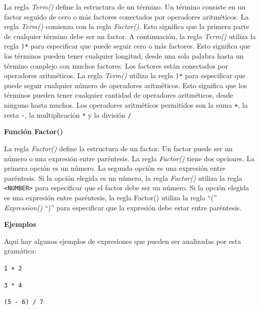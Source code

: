 \noindent La regla \textit{Term()} define la estructura de un término. Un término consiste en un factor seguido de cero o más factores conectados por operadores aritméticos. La regla \textit{Term()} comienza con la regla \textit{Factor()}. Esto significa que la primera parte de cualquier término debe ser un factor. A continuación, la regla \textit{Term()} utiliza la regla \lstinline|)*| para especificar que puede seguir cero o más factores. Esto significa que los términos pueden tener cualquier longitud, desde una sola palabra hasta un término complejo con muchos factores.
Los factores están conectados por operadores aritméticos. La regla \textit{Term()} utiliza la regla \lstinline|)*| para especificar que puede seguir cualquier número de operadores aritméticos. Esto significa que los términos pueden tener cualquier cantidad de operadores aritméticos, desde ninguno hasta muchos.
Los operadores aritméticos permitidos son la suma \lstinline|+|, la resta \lstinline|-|, la multiplicación \lstinline|*| y la división \lstinline|/|

\phantom{text}

\noindent \textbf{Función Factor()}

\phantom{text}

\lstset{inputencoding=utf8/latin1}

\noindent La regla \textit{Factor()} define la estructura de un factor. Un factor puede ser un número o una expresión entre paréntesis. La regla \textit{Factor()} tiene dos opciones. La primera opción es un número. La segunda opción es una expresión entre paréntesis. Si la opción elegida es un número, la regla \textit{Factor()} utiliza la regla \lstinline[keywordstyle=\color{black}]|<NUMBER>| para especificar que el factor debe ser un número. Si la opción elegida es una expresión entre paréntesis, la regla Factor() utiliza la regla ``('' \textit{Expression()} ``)'' para especificar que la expresión debe estar entre paréntesis.

\phantom{text}

\noindent \textbf{Ejemplos}

\phantom{text}

\noindent Aquí hay algunos ejemplos de expresiones que pueden ser analizadas por esta gramática:

\begin{center}
	\lstinline|1 + 2|

	\lstinline|3 * 4|

	\lstinline|(5 - 6) / 7|
\end{center}

